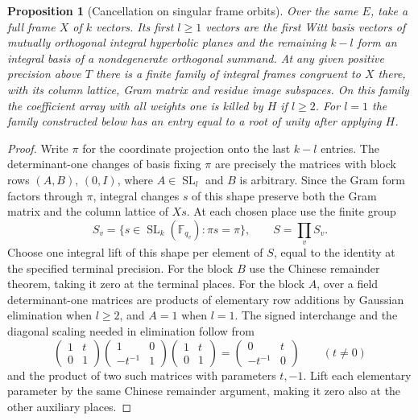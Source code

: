 \documentclass[a4paper,11pt]{article}
\newtheorem{proposition}{Proposition}[section]
\theoremstyle{definition}
\theoremstyle{remark}
\numberwithin{equation}{section}
\begin{document}
\begin{proposition}[Cancellation on singular frame orbits]
\leavevmode\label{prop:isotropickernel530}
Over the same \(E\), take a full frame \(X\) of \(k\) vectors.
Its first \(l\ge1\) vectors are the first Witt basis vectors of
mutually orthogonal integral hyperbolic planes and the remaining \(k-l\) form an
integral basis of a nondegenerate orthogonal summand. At any
given positive precision above \(T\) there is a finite family
of integral frames congruent to \(X\) there, with its column
lattice, Gram matrix and residue image subspaces. On this family
the coefficient array with all weights one is killed by \(H\) if
\(l\ge2\). For \(l=1\) the family constructed below has an
entry equal to a root of unity after applying \(H\).
\end{proposition}
\begin{proof}
Write \(\pi\) for the coordinate projection onto the last \(k-l\)
entries. The determinant-one changes of basis fixing \(\pi\)
are precisely the matrices with block rows \((A,B)\), \((0,I)\),
where \(A\in\operatorname{SL}_l\) and \(B\) is arbitrary. Since
the Gram form factors through \(\pi\), integral changes \(s\)
of this shape preserve both the Gram matrix and the column
lattice of \(Xs\). At each chosen place use the finite group
\[
             S_v=\{s\in\operatorname{SL}_k(\mathbb F_{q_v}):
                                  \pi s=\pi\},\qquad S=\prod_v S_v .
\]
Choose one integral lift of this shape per element of \(S\),
equal to the identity at the specified terminal precision.
For the block \(B\) use the Chinese remainder theorem, taking it
zero at the terminal places. For the block \(A\), over a field
determinant-one matrices are products of elementary row additions
by Gaussian elimination when \(l\ge2\), and \(A=1\) when \(l=1\).
The signed interchange
and the diagonal scaling needed in elimination follow from
\[
  \begin{pmatrix}1&t\\0&1\end{pmatrix}
  \begin{pmatrix}1&0\\-t^{-1}&1\end{pmatrix}
  \begin{pmatrix}1&t\\0&1\end{pmatrix}
       =\begin{pmatrix}0&t\\-t^{-1}&0\end{pmatrix}
       \qquad(t\ne0)
\]
and the product of two such matrices with parameters \(t,-1\).
Lift each elementary parameter by the same Chinese remainder
argument, making it zero also at the other auxiliary places.


\end{proof}
\end{document}

